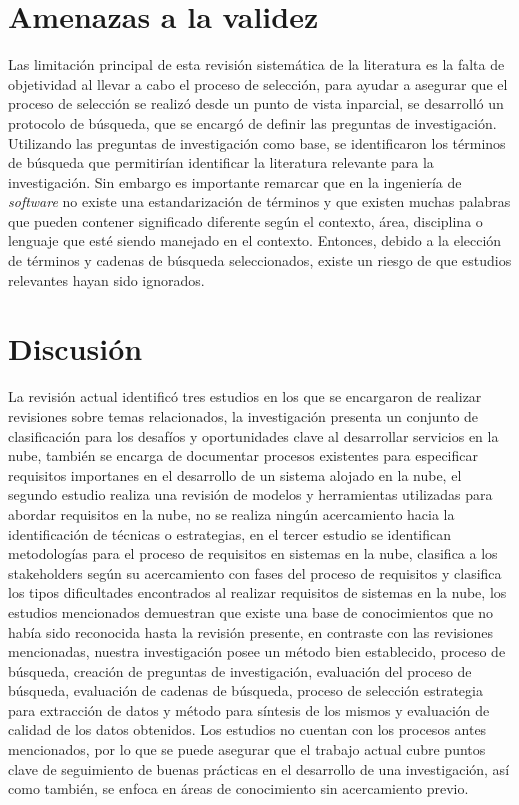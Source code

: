 \documentclass[conference,onecolumn,10pt]{IEEEtran}
\begin{document}
\section{Amenazas a la validez}
Las limitación principal de esta revisión sistemática de la literatura es la falta de objetividad al llevar a cabo el proceso de selección, 
para ayudar a asegurar que el proceso de selección se realizó desde un punto de vista inparcial, se desarrolló un protocolo de búsqueda, que se 
encargó de definir las preguntas de investigación. Utilizando las preguntas de investigación como base, se identificaron los términos de búsqueda 
que permitirían identificar la literatura relevante para la investigación. Sin embargo es importante remarcar que en la ingeniería de \emph{software}
no existe una estandarización de términos y que existen muchas palabras que pueden contener significado diferente según el contexto, área, disciplina o 
lenguaje que esté siendo manejado en el contexto. Entonces, debido a la elección de términos y cadenas de búsqueda seleccionados, existe un riesgo de que 
estudios relevantes hayan sido ignorados. 

\section{Discusión}
La revisión actual identificó tres estudios en los que se encargaron de realizar revisiones sobre temas relacionados, 
la investigación  \cite{existente1} presenta un conjunto de clasificación para los desafíos y oportunidades clave 
al desarrollar servicios en la nube, también se encarga de documentar procesos existentes para especificar requisitos 
importanes en el desarrollo de un sistema alojado en la nube, el segundo estudio \cite{existente2} realiza una revisión 
de modelos y herramientas utilizadas para abordar requisitos en la nube, no se realiza ningún acercamiento hacia 
la identificación de técnicas o estrategias, en el tercer estudio \cite{existente3} se identifican metodologías 
para el proceso de requisitos en sistemas en la nube, clasifica a los stakeholders según su acercamiento con 
fases del proceso de requisitos y clasifica los tipos dificultades encontrados al realizar requisitos de sistemas en la nube, 
los estudios mencionados demuestran que existe una base de conocimientos que no había sido reconocida hasta la revisión presente, 
en contraste con las revisiones mencionadas, nuestra investigación posee un método bien establecido, proceso de búsqueda, 
creación de preguntas de investigación, evaluación del proceso de búsqueda, evaluación de cadenas de búsqueda, proceso de selección
estrategia para extracción de datos y método para síntesis de los mismos y evaluación de calidad de los datos obtenidos. 
Los estudios no cuentan con los procesos antes mencionados, por lo que se puede asegurar que el trabajo actual cubre puntos clave
de seguimiento de buenas prácticas en el desarrollo de una investigación, así como también, se enfoca en áreas de conocimiento sin 
acercamiento previo. 
\end{document}
